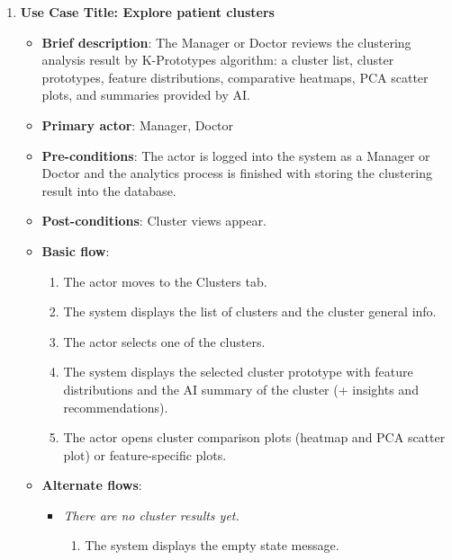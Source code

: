 \begin{enumerate}
\item \textbf{Use Case Title: Explore patient clusters}
\begin{itemize}
    \item \textbf{Brief description}: The Manager or Doctor reviews the clustering analysis result by K-Prototypes algorithm: a cluster list, cluster prototypes, feature distributions, comparative heatmaps, PCA scatter plots, and summaries provided by AI.
    \item \textbf{Primary actor}: Manager, Doctor
    \item \textbf{Pre-conditions}: The actor is logged into the system as a Manager or Doctor and the analytics process is finished with storing the clustering result into the database.
    \item \textbf{Post-conditions}: Cluster views appear.
    \item \textbf{Basic flow}:
    \begin{enumerate}
        \item The actor moves to the Clusters tab.
        \item The system displays the list of clusters and the cluster general info.
        \item The actor selects one of the clusters.
        \item The system displays the selected cluster prototype with feature distributions and the AI summary of the cluster (+ insights and recommendations).
        \item The actor opens cluster comparison plots (heatmap and PCA scatter plot) or feature-specific plots.
    \end{enumerate}
    \item \textbf{Alternate flows}:
    \begin{itemize}
        \item[1a.] \textit{There are no cluster results yet.}
        \begin{enumerate}
            \item The system displays the empty state message.
        \end{enumerate}
    \end{itemize}
\end{itemize}

\vspace{0.5em}


\end{enumerate}
